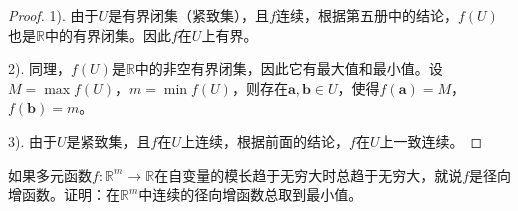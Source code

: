 \documentclass[12pt,UTF8,fontset=none]{ctexbook}
\begin{document}
\begin{proof}
1). 由于$U$是有界闭集（紧致集），且$f$连续，根据第五册中的结论，$f(U)$也是$\mathbb{R}$中的有界闭集。因此$f$在$U$上有界。

2). 同理，$f(U)$是$\mathbb{R}$中的非空有界闭集，因此它有最大值和最小值。设$M = \max f(U)$，$m = \min f(U)$，则存在$\mathbf{a}, \mathbf{b} \in U$，使得$f(\mathbf{a}) = M$，$f(\mathbf{b}) = m$。

3). 由于$U$是紧致集，且$f$在$U$上连续，根据前面的结论，$f$在$U$上一致连续。
\end{proof}





\begin{et}
    如果多元函数$f: \mathbb{R}^m\rightarrow\mathbb{R}$在自变量的模长趋于无穷大时总趋于无穷大，就说$f$是径向增函数。证明：在$\mathbb{R}^m$中连续的径向增函数总取到最小值。
\end{et}
\end{document}
